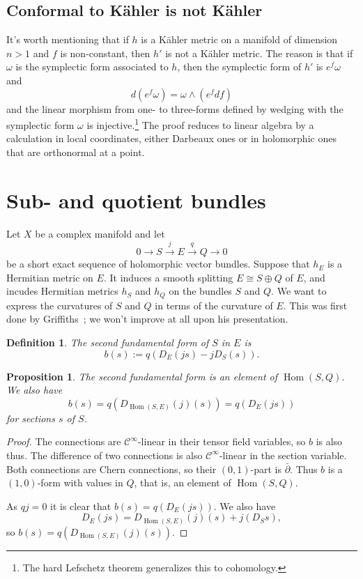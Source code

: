 \documentclass[11pt]{article}
\newtheorem{prop}[theo]{Proposition}
\newtheorem{defi}[theo]{Definition}
\newtheorem*{proof}{Proof}
\newcommand{\cc}[1]{\mathcal{#1}}
\DeclareMathOperator{\Hom}{Hom}
\begin{document}
\subsection{Conformal to K\"ahler is not K\"ahler}
\label{sec:org7b1cfdf}

It's worth mentioning that if \(h\) is a K\"ahler metric on a manifold of dimension \(n > 1\) and \(f\) is non-constant, then \(h'\) is not a K\"ahler metric. The reason is that if \(\omega\) is the symplectic form associated to \(h\), then the symplectic form of \(h'\) is \(e^f \omega\) and
$$
d(e^f \omega) = \omega \wedge (e^f df)
$$
and the linear morphism from one- to three-forms defined by wedging with the symplectic form \(\omega\) is injective.\footnote{The hard Lefschetz theorem generalizes this to cohomology.}
The proof reduces to linear algebra by a calculation in local coordinates, either Darbeaux ones or in holomorphic ones that are orthonormal at a point.


\section{Sub- and quotient bundles}
\label{sec:sub-quotient}

Let $X$ be a complex manifold and let
\[
0 \longrightarrow
S \stackrel{j}{\longrightarrow}
E \stackrel{q}{\longrightarrow}
Q \longrightarrow
0
\]
be a short exact sequence of holomorphic vector bundles. Suppose that $h_E$ is a Hermitian metric on $E$. It induces a smooth splitting $E \cong S \oplus Q$ of $E$, and incudes Hermitian metrics $h_S$ and $h_Q$ on the bundles $S$ and $Q$. We want to express the curvatures of $S$ and $Q$ in terms of the curvature of $E$. This was first done by Griffiths~\cite{griffiths1965hermitian}; we won't improve at all upon his presentation.


\begin{defi}
The \emph{second fundamental form} of $S$ in $E$ is
\[
b(s) := q(D_E(js) - jD_S(s)).
\]
\end{defi}

\begin{prop}
\label{prop:second-fundamental-form}
The second fundamental form is an element of $\Hom(S,Q)$. We also have
\[
b(s)
= q(D_{\Hom(S,E)}(j)(s))
= q(D_E(js))
\]
for sections $s$ of $S$.
\end{prop}

\begin{proof}
The connections are $\cc C^\infty$-linear in their tensor field variables, so $b$ is also thus. The difference of two connections is also $\cc C^\infty$-linear in the section variable. Both connections are Chern connections, so their $(0,1)$-part is $\bar\partial$. Thus $b$ is a $(1,0)$-form with values in $Q$, that is, an element of $\Hom(S,Q)$.

As $qj = 0$ it is clear that $b(s) = q(D_E(js))$. We also have
\[
D_E(js) = D_{\Hom(S,E)}(j)(s) + j(D_Ss),
\]
so $b(s) = q(D_{\Hom(S,E)}(j)(s))$.
\end{proof}
\end{document}
